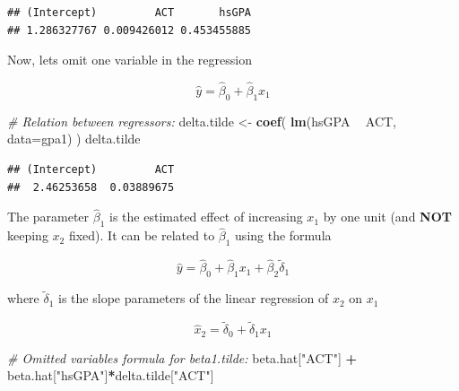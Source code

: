 \documentclass[]{book}
\newenvironment{Shaded}{\begin{snugshade}}{\end{snugshade}}
\newcommand{\CommentTok}[1]{\textcolor[rgb]{0.56,0.35,0.01}{\textit{#1}}}
\newcommand{\DataTypeTok}[1]{\textcolor[rgb]{0.13,0.29,0.53}{#1}}
\newcommand{\KeywordTok}[1]{\textcolor[rgb]{0.13,0.29,0.53}{\textbf{#1}}}
\newcommand{\NormalTok}[1]{#1}
\newcommand{\OperatorTok}[1]{\textcolor[rgb]{0.81,0.36,0.00}{\textbf{#1}}}
\newcommand{\StringTok}[1]{\textcolor[rgb]{0.31,0.60,0.02}{#1}}
\begin{document}
\begin{verbatim}
## (Intercept)         ACT       hsGPA 
## 1.286327767 0.009426012 0.453455885
\end{verbatim}

Now, lets omit one variable in the regression

\begin{equation}
\hat{y} = \hat{\beta}_{0} + \hat{\beta}_{1}x_{1}    
\label{eq:lmomitted}
\end{equation}

\begin{Shaded}
\begin{Highlighting}[]
\CommentTok{# Relation between regressors:}
\NormalTok{delta.tilde <-}\StringTok{ }\KeywordTok{coef}\NormalTok{( }\KeywordTok{lm}\NormalTok{(hsGPA }\OperatorTok{~}\StringTok{ }\NormalTok{ACT, }\DataTypeTok{data=}\NormalTok{gpa1) )}
\NormalTok{delta.tilde}
\end{Highlighting}
\end{Shaded}

\begin{verbatim}
## (Intercept)         ACT 
##  2.46253658  0.03889675
\end{verbatim}

The parameter \(\hat\beta_1\) is the estimated effect of increasing
\(x_1\) by one unit (and \textbf{NOT} keeping \(x_2\) fixed). It can be
related to \(\hat\beta_1\) using the formula

\begin{equation}
\hat{y} = \hat{\beta}_{0} + \hat{\beta}_{1} x_{1} +  \hat{\beta}_{2}  \tilde\delta_{1}
\label{eq:lmommited}
\end{equation}

where \(\tilde\delta_{1}\) is the slope parameters of the linear
regression of \(x_2\) on \(x_1\)

\begin{equation}
\hat{x}_2 = \tilde\delta_{0} + \tilde\delta_{1} x_{1}
\label{eq:lmomitted2}
\end{equation}

\begin{Shaded}
\begin{Highlighting}[]
\CommentTok{# Omitted variables formula for beta1.tilde:}
\NormalTok{beta.hat[}\StringTok{"ACT"}\NormalTok{] }\OperatorTok{+}\StringTok{ }\NormalTok{beta.hat[}\StringTok{"hsGPA"}\NormalTok{]}\OperatorTok{*}\NormalTok{delta.tilde[}\StringTok{"ACT"}\NormalTok{]}
\end{Highlighting}
\end{Shaded}
\end{document}
